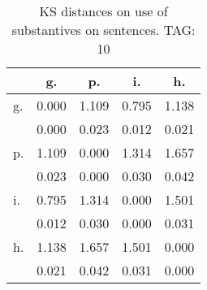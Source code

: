 \begin{table}[h!]
\begin{center}
\begin{tabular}{| l | c | c | c | c |}\hline
 & g. & p. & i. & h. \\\hline
g. & 0.000  & 1.109  & 0.795  & 1.138 \\\hline
 & 0.000  & 0.023  & 0.012  & 0.021 \\\hline
p. & 1.109  & 0.000  & 1.314  & 1.657 \\\hline
 & 0.023  & 0.000  & 0.030  & 0.042 \\\hline
i. & 0.795  & 1.314  & 0.000  & 1.501 \\\hline
 & 0.012  & 0.030  & 0.000  & 0.031 \\\hline
h. & 1.138  & 1.657  & 1.501  & 0.000 \\\hline
 & 0.021  & 0.042  & 0.031  & 0.000 \\\hline
\end{tabular}
\caption{KS distances on use of substantives on sentences. TAG: 10}
\end{center}
\end{table}